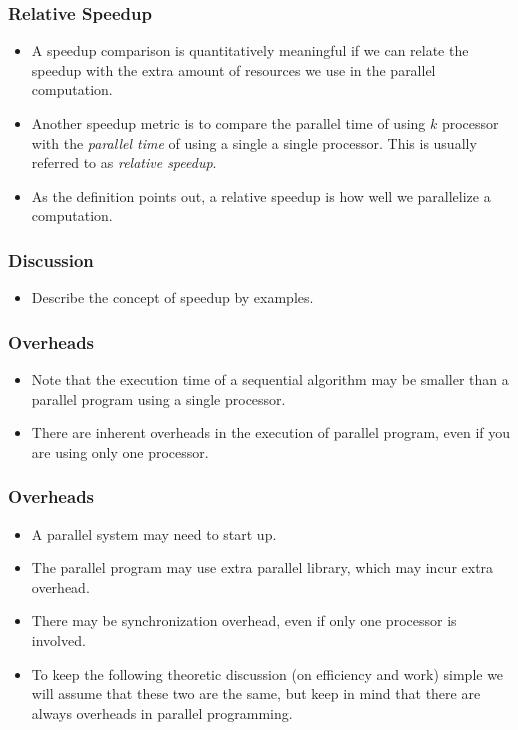 \documentclass{beamer}
\begin{document}
\begin{CJK}{UTF8}{bsmi}
\begin{frame}
\frametitle{Relative Speedup}
\begin{itemize}
\item A speedup comparison is quantitatively meaningful if we can relate
  the speedup with the extra amount of resources we use in the
  parallel computation.
\item Another speedup metric is to compare the parallel time of using
  $k$ processor with the {\em parallel time} of using a single a
  single processor.  This is usually referred to as {\em relative
    speedup}.
\item As the definition points out, a relative speedup is how well we
  parallelize a computation.
\end{itemize}
\end{frame}


\begin{frame}
\frametitle{Discussion}
\begin{itemize}
\item Describe the concept of speedup by examples.
\end{itemize}
\end{frame}

\begin{frame}
\frametitle{Overheads}
\begin{itemize}
\item Note that the execution time of a sequential algorithm may be
  smaller than a parallel program using a single processor.
\item There are inherent overheads in the execution of parallel
  program, even if you are using only one processor.
\end{itemize}
\end{frame}

\begin{frame}
\frametitle{Overheads}
\begin{itemize}
\item A parallel system may need to start up.
\item The parallel program may use extra parallel library, which may
  incur extra overhead.
\item There may be synchronization overhead, even if only one
  processor is involved.
\item To keep the following theoretic discussion (on efficiency and
  work) simple we will assume that these two are the same, but keep in
  mind that there are always overheads in parallel programming.
\end{itemize}
\end{frame}



\end{CJK}
\end{document}

